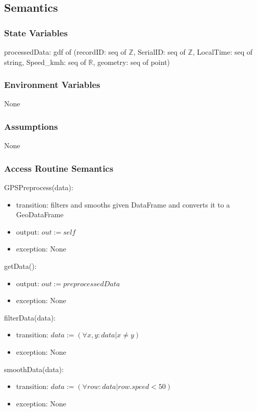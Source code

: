 \documentclass[12pt, titlepage]{article}
\begin{document}
\subsection{Semantics}

\subsubsection{State Variables}

processedData:  gdf of (recordID: seq of $\mathbb{Z}$, SerialID: seq of $\mathbb{Z}$, LocalTime: seq of string, Speed\_kmh: seq of $\mathbb{R}$, geometry: seq of point)

\subsubsection{Environment Variables}

None

\subsubsection{Assumptions}

None

\subsubsection{Access Routine Semantics}

\noindent GPSPreprocess(data):
\begin{itemize}
\item transition: filters and smooths given DataFrame and converts it to a GeoDataFrame
\item output: $out := self$
\item exception: None
\end{itemize}

\noindent getData():
\begin{itemize}
\item output: $out := preprocessedData$
\item exception: None
\end{itemize}

\noindent filterData(data):
\begin{itemize}
\item transition: $data := (\forall x, y : data | x \neq y)$
\item exception: None
\end{itemize}

\noindent smoothData(data):
\begin{itemize}
\item transition: $data := (\forall row : data | row.speed < 50)$
\item exception: None
\end{itemize}
\end{document}
